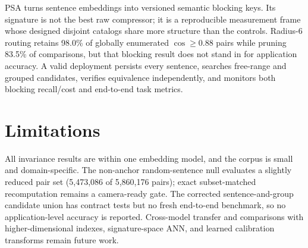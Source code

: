 \documentclass[11pt]{article}
\begin{document}
PSA turns sentence embeddings into versioned semantic blocking keys. Its signature is not the best raw compressor; it is a reproducible measurement frame whose designed disjoint catalogs share more structure than the controls. Radius-6 routing retains 98.0\% of globally enumerated $\cos\geq0.88$ pairs while pruning 83.5\% of comparisons, but that blocking result does not stand in for application accuracy. A valid deployment persists every sentence, searches free-range and grouped candidates, verifies equivalence independently, and monitors both blocking recall/cost and end-to-end task metrics.

\section{Limitations}

All invariance results are within one embedding model, and the corpus is small and domain-specific. The non-anchor random-sentence null evaluates a slightly reduced pair set (5,473,086 of 5,860,176 pairs); exact subset-matched recomputation remains a camera-ready gate. The corrected sentence-and-group candidate union has contract tests but no fresh end-to-end benchmark, so no application-level accuracy is reported. Cross-model transfer and comparisons with higher-dimensional indexes, signature-space ANN, and learned calibration transforms remain future work.


\end{document}
